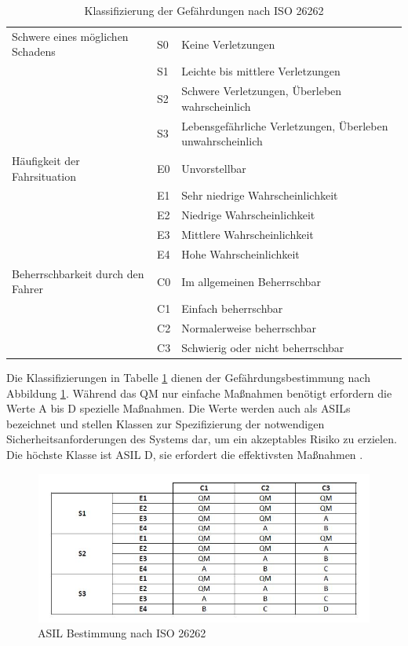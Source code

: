 \begin{table}[htpb]
	\scriptsize
	\caption[Klassifizierung der Gefährdungen nach ISO 26262]{Klassifizierung der Gefährdungen nach ISO 26262 \parencite[S. 95]{Hillenbrand.2012}}\label{tab:Kategorisierung nach ISO 26262}
	\centering
	\begin{tabular}{l l p{7cm}}
		\toprule
		Schwere eines möglichen Schadens & S0 & Keine Verletzungen\\
		& S1 & Leichte bis mittlere Verletzungen\\
		& S2 & Schwere Verletzungen, Überleben wahrscheinlich\\
		& S3 & Lebensgefährliche Verletzungen, Überleben unwahrscheinlich\\
		\midrule
		Häufigkeit der Fahrsituation & E0 & Unvorstellbar\\
		& E1 & Sehr niedrige Wahrscheinlichkeit\\
		& E2 & Niedrige Wahrscheinlichkeit\\
		& E3 & Mittlere Wahrscheinlichkeit\\
		& E4 & Hohe Wahrscheinlichkeit\\
		\midrule
		Beherrschbarkeit durch den Fahrer & C0 & Im allgemeinen Beherrschbar\\
		& C1 & Einfach beherrschbar\\
		& C2 & Normalerweise beherrschbar\\
		& C3 & Schwierig oder nicht beherrschbar\\
		\bottomrule
	\end{tabular}
\end{table}

Die Klassifizierungen in Tabelle \ref{tab:Kategorisierung nach ISO 26262} dienen der Gefährdungsbestimmung nach Abbildung \ref{fig:ISO 26262}. Während das \ac{QM} nur einfache Maßnahmen benötigt erfordern die Werte A bis D spezielle Maßnahmen. Die Werte werden auch als \acp{ASIL} bezeichnet und stellen Klassen zur Spezifizierung der notwendigen Sicherheitsanforderungen des Systems dar, um ein akzeptables Risiko zu erzielen. Die höchste Klasse ist \acs{ASIL} D, sie erfordert die effektivsten Maßnahmen \parencite[S.94ff]{Hillenbrand.2012}.

\begin{savenotes}
	\begin{figure}[H]
		\centering
		\includegraphics[width=12cm,height=5cm]{figures/ISO_26262}
		\caption[ASIL Bestimmung nach ISO 26262]{ASIL Bestimmung nach ISO 26262 \parencite[S. 96]{Hillenbrand.2012}}\label{fig:ISO 26262}
	\end{figure}
\end{savenotes}


